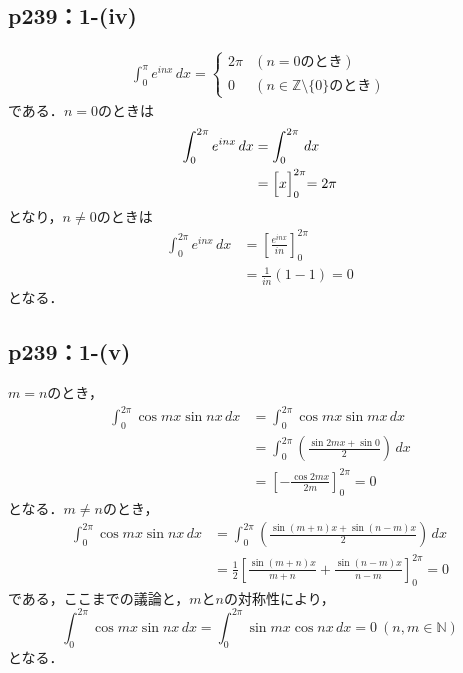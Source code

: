 \documentclass[uplatex,dvipdfmx,a4paper,10pt,fleqn]{jsarticle}
\begin{document}
\subsection*{p239：1-(iv)}
	\begin{screen}
		\begin{align*}
			\int_{0}^{\pi} e^{inx} \, dx  =
			\begin{cases}
				2 \pi & (n=0 のとき) \\
				0 & (n \in \mathbb{Z}\setminus \{0\} のとき)
			\end{cases}
		\end{align*}
		である．$n=0$のときは
		\begin{align*}
			\int_{0}^{2 \pi} e^{inx} \, dx & = \int_{0}^{2\pi} \, dx \\
			& = \Bigl[x\Bigl]_{0}^{2\pi} = 2\pi
		\end{align*}
		となり，$n \ne 0$のときは
		\begin{align*}
			\int_{0}^{2\pi} e^{inx} \, dx & = \left [\frac{e^{inx}}{in} \right ]_{0}^{2\pi} \\
			& = \frac{1}{in} (1-1)=0
		\end{align*}
		となる．
	\end{screen}


\subsection*{p239：1-(v)}

	\begin{screen}
		$m=n$のとき，
		\begin{align*}
			\int_{0}^{2\pi} \cos m x \sin nx \, dx & = \int_{0}^{2\pi} \cos mx \sin mx \, dx \\
			& = \int_{0}^{2\pi} \left (\frac{\sin 2mx + \sin 0}{2}\right ) \, dx \\
			& = \left [-\frac{\cos 2mx}{2m}\right ]_{0}^{2\pi} =0
		\end{align*}
		となる．$m \ne n$のとき，
		\begin{align*}
			\int_{0}^{2\pi} \cos mx \sin nx \, dx & = \int_{0}^{2\pi} \left (\frac{\sin (m+n)x + \sin (n-m)x}{2}\right) \, dx \\
			& = \frac{1}{2}\left [\frac{\sin (m+n)x}{m+n}+\frac{\sin (n-m)x}{n-m} \right]_{0}^{2\pi} =0
		\end{align*}
		である，ここまでの議論と，$m$と$n$の対称性により，
			\[
				\int_{0}^{2\pi} \cos mx \sin nx \, dx =\int_{0}^{2\pi} \sin mx \cos nx \, dx =0 ~(n,m \in \mathbb{N})
			\]
		となる．
	\end{screen}
\end{document}
